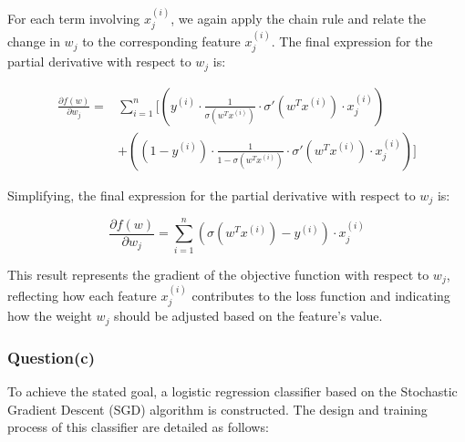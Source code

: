 \documentclass[a4paper, utf8]{ctexart}
\begin{document}
	For each term involving $x_j^{(i)}$, we again apply the chain rule and relate the change in $w_j$ to the corresponding feature $x_j^{(i)}$. The final expression for the partial derivative with respect to $w_j$ is:
	
	\vspace{-.5em}
	\begin{equation}
		\begin{aligned}
			\frac{\partial f(w)}{\partial w_j} = & \sum_{i=1}^{n} \Bigg[ \left( y^{(i)} \cdot \frac{1}{\sigma(w^T x^{(i)})} \cdot \sigma'(w^T x^{(i)}) \cdot x_j^{(i)} \right) \\
			&+ \left( (1 - y^{(i)}) \cdot \frac{1}{1 - \sigma(w^T x^{(i)})} \cdot \sigma'(w^T x^{(i)}) \cdot x_j^{(i)} \right) \Bigg]
		\end{aligned}
		\nonumber
	\end{equation}
	
	Simplifying, the final expression for the partial derivative with respect to $w_j$ is:
	
	\vspace{-.5em}
	\begin{equation}
		\frac{\partial f(w)}{\partial w_j} = \sum_{i=1}^{n} \left( \sigma(w^T x^{(i)}) - y^{(i)} \right) \cdot x_j^{(i)}
		\nonumber
	\end{equation}
	
	This result represents the gradient of the objective function with respect to $w_j$, reflecting how each feature $x_j^{(i)}$ contributes to the loss function and indicating how the weight $w_j$ should be adjusted based on the feature's value.
	
	\subsubsection{Question(c)}
	
	To achieve the stated goal, a logistic regression classifier based on the Stochastic Gradient Descent (SGD) algorithm is constructed. The design and training process of this classifier are detailed as follows:
	
\end{document}
